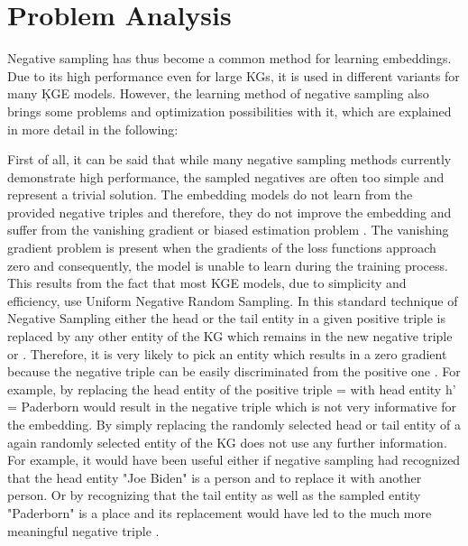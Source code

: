 \section{Problem Analysis}

Negative sampling has thus become a common method for learning embeddings.
Due to its high performance even for large \acp{KG}, it is used in different variants for many \c{KGE} models.
However, the learning method of negative sampling also brings some problems and optimization possibilities with it, which are explained in more detail in the following:

First of all, it can be said that while many negative sampling methods currently demonstrate high performance, the sampled negatives are often too simple and represent a trivial solution. 
The embedding models do not learn from the provided negative triples and therefore, they do not improve the embedding and suffer from the vanishing gradient or biased estimation problem \cite{zhang2021efficient}.
The vanishing gradient problem is present when the gradients of the loss functions approach zero and consequently, the model is unable to learn during the training process.
This results from the fact that most KGE models, due to simplicity and efficiency, use Uniform Negative Random Sampling.
In this standard technique of Negative Sampling either the head or the tail entity in a given positive triple  is replaced by any other entity of the \ac{KG} which remains in the new negative triple  or . 
Therefore, it is very likely to pick an entity which results in a zero gradient because
the negative triple can be easily discriminated from the positive one \cite{cai2017kbgan}.
For example, by replacing the head entity of the positive triple  =  with head entity h' = Paderborn would result in the negative triple  which is not very informative for the embedding.
By simply replacing the randomly selected head or tail entity of a again randomly selected entity of the KG does not use any further information.
For example, it would have been useful either if negative sampling had recognized that the head entity "Joe Biden" is a person and to replace it with another person.
Or by recognizing that the tail entity as well as the sampled entity "Paderborn" is a place and its replacement would have led to the  much more meaningful negative triple .  

